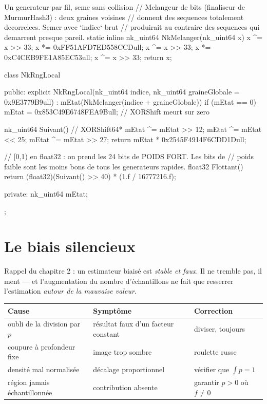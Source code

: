 \begin{nkcode}{Un generateur par fil, seme sans collision}
// Melangeur de bits (finaliseur de MurmurHash3) : deux graines voisines
// donnent des sequences totalement decorrelees. Semer avec `indice` brut
// produirait au contraire des sequences qui demarrent presque pareil.
static inline nk_uint64 NkMelanger(nk_uint64 x) {
    x ^= x >> 33;  x *= 0xFF51AFD7ED558CCDull;
    x ^= x >> 33;  x *= 0xC4CEB9FE1A85EC53ull;
    x ^= x >> 33;
    return x;
}

class NkRngLocal {
    public:
        explicit NkRngLocal(nk_uint64 indice, nk_uint64 graineGlobale = 0x9E3779B9ull)
            : mEtat(NkMelanger(indice + graineGlobale)) {
            if (mEtat == 0)
                mEtat = 0x853C49E6748FEA9Bull;   // XORShift meurt sur zero
        }

        nk_uint64 Suivant() {                    // XORShift64*
            mEtat ^= mEtat >> 12;
            mEtat ^= mEtat << 25;
            mEtat ^= mEtat >> 27;
            return mEtat * 0x2545F4914F6CDD1Dull;
        }

        // [0,1) en float32 : on prend les 24 bits de POIDS FORT. Les bits de
        // poids faible sont les moins bons de tous les generateurs rapides.
        float32 Flottant() {
            return (float32)(Suivant() >> 40) * (1.f / 16777216.f);
        }

    private:
        nk_uint64 mEtat;
};
\end{nkcode}

\section{Le biais silencieux}

Rappel du chapitre 2 : un estimateur biaisé est \emph{stable et faux}. Il ne
tremble pas, il ment — et l'augmentation du nombre d'échantillons ne fait que
resserrer l'estimation \emph{autour de la mauvaise valeur}.

\begin{center}
\begin{tabular}{@{}p{5.2cm}p{4.2cm}p{4.4cm}@{}}
\toprule
\textbf{Cause} & \textbf{Symptôme} & \textbf{Correction} \\
\midrule
oubli de la division par $p$ & résultat faux d'un facteur constant & diviser, toujours \\
coupure à profondeur fixe & image trop sombre & roulette russe \\
densité mal normalisée & décalage proportionnel & vérifier que $\int p = 1$ \\
région jamais échantillonnée & contribution absente & garantir $p > 0$ où $f \neq 0$ \\
\bottomrule
\end{tabular}
\end{center}

